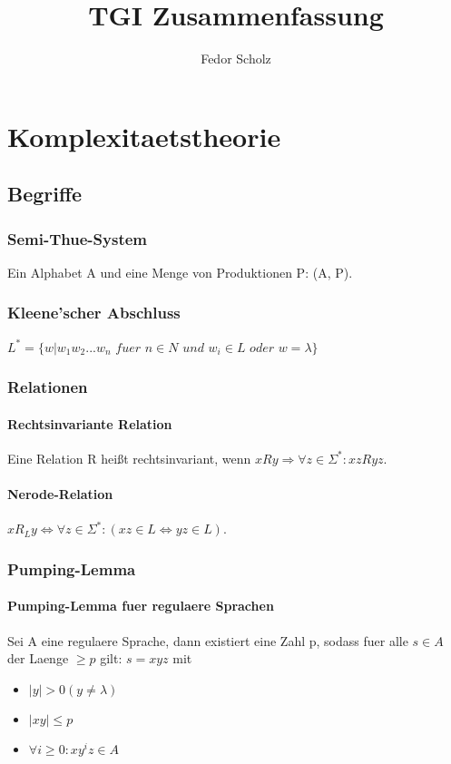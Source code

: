 \documentclass[a4paper]{scrreprt}
\begin{document}
\title{TGI Zusammenfassung}
\author{Fedor Scholz}
\maketitle

\tableofcontents
\vspace{1cm}

\chapter{Komplexitaetstheorie}



\section{Begriffe}

\subsection{Semi-Thue-System}
Ein Alphabet A und eine Menge von Produktionen P: (A, P).

\subsection{Kleene'scher Abschluss}
$L^* = \{w|w_1w_2...w_n$ $fuer$ $n \in N$ $und$ $w_i \in L$ $oder$ $w = \lambda\}$

\subsection{Relationen}
\subsubsection{Rechtsinvariante Relation}
Eine Relation R heißt rechtsinvariant, wenn $xRy \Rightarrow \forall z \in \Sigma^*: xzRyz$.

\subsubsection{Nerode-Relation}
$xR_Ly \Leftrightarrow \forall z \in \Sigma^*: (xz \in L \Leftrightarrow yz \in L)$.

\subsection{Pumping-Lemma}
\subsubsection{Pumping-Lemma fuer regulaere Sprachen}
Sei A eine regulaere Sprache, dann existiert eine Zahl p, sodass fuer alle $s \in A$ der Laenge $\ge p$ gilt: $s = xyz$ mit
\begin{itemize}
	\item $|y| > 0 (y \neq \lambda)$
	\item $|xy| \le p$
	\item $\forall i \ge 0: xy^iz \in A$
\end{itemize}
\end{document}
